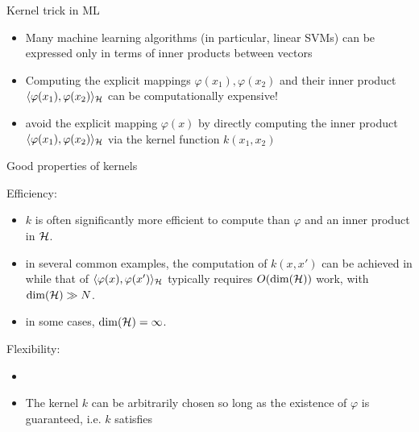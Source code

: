 \documentclass[xcolor={usenames,dvipsnames}]{beamer}
\begin{document}
\begin{frame}{Kernel trick in ML}
\begin{itemize}
\item Many machine learning algorithms (in particular, linear SVMs) can be expressed only in terms of inner products between vectors

\bigskip

\item Computing the explicit mappings $ \varphi (x_1 ) , \varphi(x_2) $ and their inner product $\langle \varphi (x_1 ) , \varphi(x_2) \rangle_{\mathcal{H}}$ can be computationally expensive!

\bigskip


\item {} avoid the explicit mapping $ \varphi (x )$ by directly computing the inner product  $\langle \varphi (x_1 ) , \varphi(x_2) \rangle_{\mathcal{H}}$  via the kernel function $k(x_1, x_2)$

\end{itemize}
\end{frame}


\begin{frame}{Good properties of kernels}

\begin{block}{Efficiency:} 
\begin{itemize}
\item $k$ is often significantly more efficient to compute than $\varphi$ and an inner product in $\mathcal{H}$. 
\item in several common examples, the computation of $k(x,x')$ can be achieved in  while that of $\langle \varphi (x ) , \varphi(x') \rangle_{\mathcal{H}}$ typically requires $O(\dim(\mathcal{H}))$ work, with $\dim(\mathcal{H}) \gg N$. 
\item in some cases, $\dim (\mathcal{H}) = \infty$.
\end{itemize}
\end{block}


\begin{block}{Flexibility:} 
\begin{itemize}
\item  {}
\item The kernel $k$ can be arbitrarily chosen so long as the existence of $\varphi$ is guaranteed, i.e. $k$ satisfies 
\end{itemize}
\end{block}
\end{frame}
\end{document}
